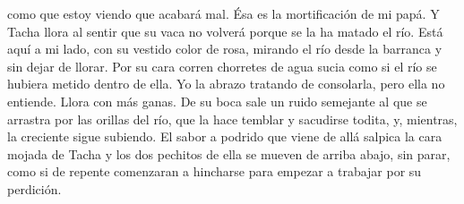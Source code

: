 	como que estoy viendo que acabará mal.
\pend
%
\pstart
	Ésa es la mortificación de mi papá.
\pend
%
\pstart
	Y Tacha llora al sentir que su vaca no volverá porque se la ha matado el río. Está aquí a mi lado, con su vestido color de rosa, mirando el río desde la barranca y sin dejar de llorar. Por su cara corren chorretes de agua sucia como si el río se hubiera metido dentro de ella.
\pend
%
\pstart
	Yo la abrazo tratando de consolarla, pero ella no entiende. Llora con más ganas. De su boca sale un ruido semejante al que se arrastra por las orillas del río, que la hace temblar y sacudirse todita, y, mientras, la creciente sigue subiendo. El sabor a podrido que viene de allá salpica la cara mojada de Tacha y los dos pechitos de ella se mueven de arriba abajo, sin parar, como si de repente comenzaran a hincharse para empezar a trabajar por su perdición.
\pend
